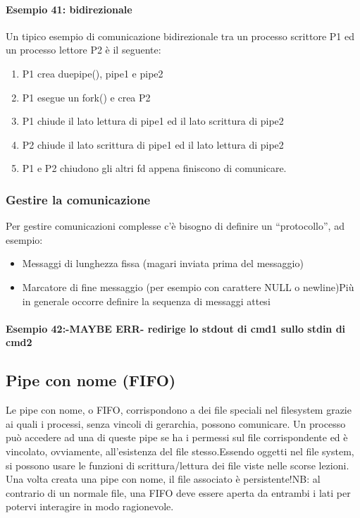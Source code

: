     \paragraph{Esempio 41: bidirezionale}\hfill \break
    Un tipico esempio di comunicazione bidirezionale tra un processo scrittore P1 ed un processo lettore P2 è il seguente:
    \begin{enumerate}
        \item P1 crea duepipe(), pipe1 e pipe2
        \item P1 esegue un fork() e crea P2
        \item P1 chiude il lato lettura di pipe1 ed il lato scrittura di pipe2
        \item P2 chiude il lato scrittura di pipe1 ed il lato lettura di pipe2
        \item P1 e P2 chiudono gli altri fd appena finiscono di comunicare.
    \end{enumerate}
    
    
    \subsubsection{Gestire la comunicazione}
    Per gestire comunicazioni complesse c'è bisogno di definire un “protocollo”, ad esempio:
    \begin{itemize}
        \item Messaggi di lunghezza fissa (magari inviata prima del messaggio)
        \item Marcatore di fine messaggio (per esempio con carattere NULL o newline)Più in generale occorre definire la sequenza di messaggi attesi
    \end{itemize}

    \paragraph{Esempio 42:-MAYBE ERR- redirige lo stdout di cmd1 sullo stdin di cmd2} \hfill \break
 

    \subsection{Pipe con nome (FIFO)}
    Le pipe con nome, o FIFO, corrispondono a dei file speciali nel filesystem grazie ai quali i processi, senza vincoli di gerarchia, possono comunicare. Un processo può accedere ad una di queste pipe se ha i permessi sul file corrispondente ed è vincolato, ovviamente, all'esistenza del file stesso.Essendo oggetti nel file system, si possono usare le funzioni di scrittura/lettura dei file viste nelle scorse lezioni. Una volta creata una pipe con nome, il file associato è persistente!NB: al contrario di un normale file, una FIFO deve essere aperta da entrambi i lati per potervi interagire in modo ragionevole.
